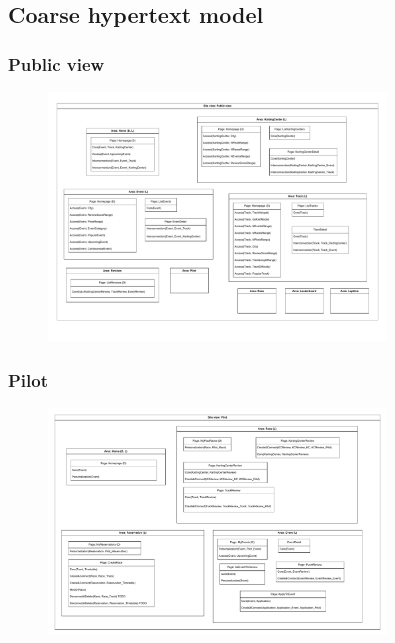 \documentclass{beamer}
\begin{document}
\subsection*{Coarse hypertext model}

\begin{frame}
    \frametitle{Public view}
    \begin{figure}
        \centering
        \includegraphics[width=0.8\textwidth]{drawio/public-view.pdf}
    \end{figure}
\end{frame}

\begin{frame}
    \frametitle{Pilot}
    \begin{figure}
        \centering
        \includegraphics[width=0.8\textwidth]{drawio/pilot-view.pdf}
    \end{figure}
\end{frame}























\end{document}
